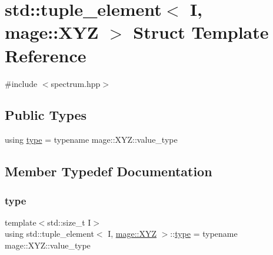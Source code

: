 \hypertarget{structstd_1_1tuple__element_3_01_i_00_01mage_1_1_x_y_z_01_4}{}\section{std\+:\+:tuple\+\_\+element$<$ I, mage\+:\+:X\+YZ $>$ Struct Template Reference}
\label{structstd_1_1tuple__element_3_01_i_00_01mage_1_1_x_y_z_01_4}


{\ttfamily \#include $<$spectrum.\+hpp$>$}

\subsection*{Public Types}
\begin{DoxyCompactItemize}
\item 
using \mbox{\hyperlink{structstd_1_1tuple__element_3_01_i_00_01mage_1_1_x_y_z_01_4_ab340458d10d806cc004b738bc1b587d3}{type}} = typename mage\+::\+X\+Y\+Z\+::value\+\_\+type
\end{DoxyCompactItemize}


\subsection{Member Typedef Documentation}
\mbox{\label{structstd_1_1tuple__element_3_01_i_00_01mage_1_1_x_y_z_01_4_ab340458d10d806cc004b738bc1b587d3}} 
\subsubsection{\texorpdfstring{type}{type}}
{\footnotesize\ttfamily template$<$std\+::size\+\_\+t I$>$ \\
using std\+::tuple\+\_\+element$<$ I, \mbox{\hyperlink{structmage_1_1_x_y_z}{mage\+::\+X\+YZ}} $>$\+::\mbox{\hyperlink{structstd_1_1tuple__element_3_01_i_00_01mage_1_1_x_y_z_01_4_ab340458d10d806cc004b738bc1b587d3}{type}} =  typename mage\+::\+X\+Y\+Z\+::value\+\_\+type}

